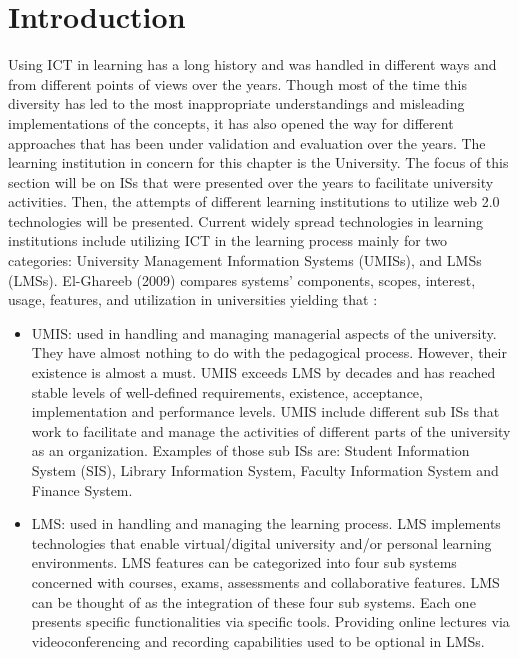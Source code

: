 \documentclass[12pt,a4paper,final,twoside,onecolumn,titlepage]{book}
\begin{document}
\section{Introduction}
Using ICT in learning has a long history and was handled in different ways and from different points of views over the years. Though most of the time this diversity has led to the most inappropriate understandings and misleading implementations of the concepts, it has also opened the way for different approaches that has been under validation and evaluation over the years. The learning institution in concern for this chapter is the University. The focus of this section will be on \gls{IS}s that were presented over the years to facilitate university activities. Then, the attempts of different learning institutions to utilize web 2.0 technologies will be presented. Current widely spread technologies in learning institutions include utilizing ICT in the learning process mainly for two categories: University Management Information Systems (\gls{UMIS}s), and \gls{LMS}s (\gls{LMS}s). El-Ghareeb (2009) compares systems’ components, scopes, interest, usage, features, and utilization in universities yielding that \cite{W01}:
\begin{itemize}
\item \gls{UMIS}: used in handling and managing managerial aspects of the university. They have almost nothing to do with the pedagogical process. However, their existence is almost a must. \gls{UMIS} exceeds \gls{LMS} by decades and has reached stable levels of well-defined requirements, existence, acceptance, implementation and performance levels. \gls{UMIS} include different sub \gls{IS}s that work to facilitate and manage the activities of different parts of the university as an organization. Examples of those sub \gls{IS}s are: Student Information System (SIS), Library Information System, Faculty Information System and Finance System.
\item \gls{LMS}: used in handling and managing the learning process. \gls{LMS} implements technologies that enable virtual/digital university and/or personal learning environments. \gls{LMS} features can be categorized into four sub systems concerned with courses, exams, assessments and collaborative features. \gls{LMS} can be thought of as the integration of these four sub systems. Each one presents specific functionalities via specific tools. Providing online lectures via videoconferencing and recording capabilities used to be optional in \gls{LMS}s.
\end{itemize}
\end{document}
